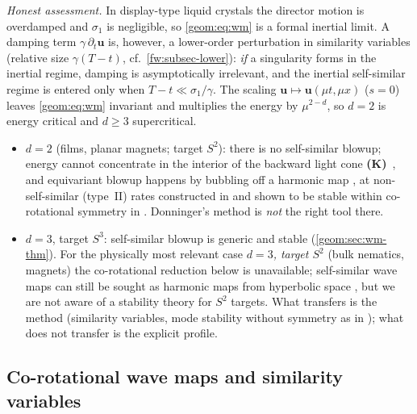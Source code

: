\emph{Honest assessment.} In display-type liquid crystals the director
motion is overdamped and $\sigma_1$ is negligible, so \eqref{geom:eq:wm} is
a formal inertial limit. A damping term $\gamma\,\partial_t\bm u$ is, however,
a lower-order perturbation in similarity variables (relative size
$\gamma(T-t)$, cf.\ \cref{fw:subsec-lower}): \emph{if} a
singularity forms in the inertial regime, damping is asymptotically
irrelevant, and the inertial self-similar regime is entered only when
$T-t\ll\sigma_1/\gamma$. The scaling $\bm u\mapsto\bm u(\mu t,\mu x)$ ($s=0$)
leaves \eqref{geom:eq:wm} invariant and multiplies the energy by
$\mu^{2-d}$, so $d=2$ is energy critical and $d\ge3$ supercritical.
\begin{itemize}[leftmargin=*]
\item $d=2$ (films, planar magnets; target $S^2$): there is no
  self-similar blowup; energy cannot concentrate in the interior of the
  backward light cone \textbf{(K)}~\cite{ShatahTahvildarZadeh1992}, and
  equivariant blowup happens by bubbling off a harmonic map
  \cite{Struwe2003}, at non-self-similar (type~II) rates constructed in
  \cite{KriegerSchlagTataru2008} and shown to be stable within
  co-rotational symmetry in \cite{RaphaelRodnianski2012}. Donninger's
  method is \emph{not} the right tool there.
\item $d=3$, target $S^3$: self-similar blowup is generic and stable
  (\cref{geom:sec:wm-thm}). For the physically most relevant case
  \emph{$d=3$, target $S^2$} (bulk nematics, magnets) the co-rotational
  reduction below is unavailable; self-similar wave maps can still be
  sought as harmonic maps from hyperbolic space
  \cite{CazenaveShatahTahvildarZadeh1998}, but we are not aware of a
  stability theory for $S^2$ targets. What transfers is the method
  (similarity variables, mode stability without symmetry as in
  \cite{WeissenbacherKochDonninger2025,DonningerMoscatelli2026a}); what
  does not transfer is the explicit profile.
\end{itemize}

\subsection{Co-rotational wave maps and similarity variables}
\label{geom:sec:wm-setup}

